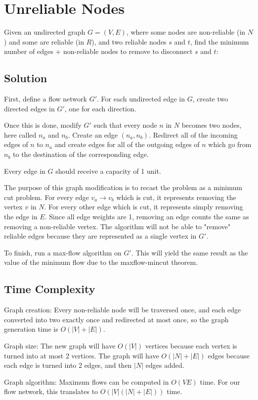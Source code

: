 \documentclass{article}
\begin{document}
\section{Unreliable Nodes}

Given an undirected graph $G = (V,E)$,  where some nodes are non-reliable (in
$N$) and some are reliable (in $R$), and two reliable nodes $s$ and $t$, find
the minimum number of edges + non-reliable nodes to remove to disconnect $s$
and $t$:

\subsection{Solution}

First, define a flow network $G'$. For each undirected edge in $G$, create two
directed edges in $G'$, one for each direction.

Once this is done, modify $G'$ such that every node $n$ in $N$ becomes two nodes,
here called $n_a$ and $n_b$. Create an edge $(n_a,n_b)$. Redirect all of the
incoming edges of $n$ to $n_a$ and create edges for all of the outgoing edges
of $n$ which go from $n_b$ to the destination of the corresponding edge.

Every edge in $G$ should receive a capacity of 1 unit.

The purpose of this graph modification is to recast the problem as a
minimum cut problem. For every edge $v_a \to v_b$ which is cut, it represents
removing the vertex $v$ in $N$. For every other edge which is cut, it
represents simply removing the edge in $E$. Since all edge weights are 1,
removing an edge counts the same as removing a non-reliable vertex. The
algorithm will not be able to "remove" reliable edges because they are
represented as a single vertex in $G'$.

To finish, run a max-flow algorithm on $G'$. This will yield
the same result as the value of the minimum flow due to the maxflow-mincut
theorem.

\subsection{Time Complexity}

Graph creation: Every non-reliable node will be traversed once, and each edge
converted into two exactly once and redirected at most once, so the graph
generation time is $O(|V| + |E|)$.

Graph size: The new graph will have $O(|V|)$ vertices because each vertex is
turned into at most 2 vertices. The graph will have $O(|N|+|E|)$ edges because
each edge is turned into 2 edges, and then $|N|$ edges added.

Graph algorithm: Maximum flows can be computed in $O(VE)$ time. For our flow
network, this translates to $O(|V|(|N|+|E|))$ time.
\end{document}
